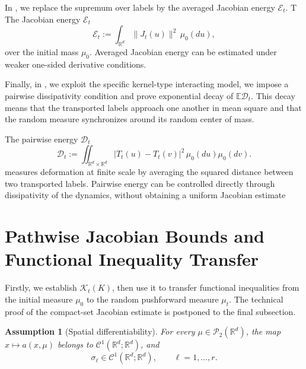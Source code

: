 \documentclass{tsp-short}
\newtheorem{assumption}{Assumption}
\theoremstyle{remark}
\theoremstyle{definition}
\newcommand{\R}{\mathbb{R}} %
\newcommand{\cP}{\mathcal{P}} %
\newcommand{\cC}{\mathcal{C}} %
\newcommand{\E}{\mathbb E} %
\begin{document}
In , we replace the supremum over labels by the averaged Jacobian energy \(\mathcal E_t\). T
The Jacobian energy \(\mathcal E_t\)
\begin{equation*}
	\mathcal E_t := \int_{\R^d}\|J_t(u)\|^2\,\mu_0(du),
\end{equation*}
over the initial mass \( \mu_0 \). Averaged Jacobian energy can be estimated under weaker one-sided
derivative conditions.

Finally, in , we exploit the specific kernel-type interacting model,
we impose a pairwise dissipativity condition and prove exponential decay of \(\E\mathcal D_t\).
This decay means that the transported labels approach one another in mean square and that the random measure synchronizes around its random
center of mass.

The pairwise energy \(\mathcal D_t\)
\begin{equation*}
	\mathcal D_t :=	\iint_{\R^d\times\R^d} |T_t(u)-T_t(v)|^2\,\mu_0(du)\mu_0(dv).
\end{equation*}
measures deformation at finite scale by averaging the squared distance between two transported labels.
Pairwise energy can be controlled directly through dissipativity of the dynamics, without obtaining a uniform Jacobian estimate

\clearpage

\section{Pathwise Jacobian Bounds and Functional Inequality Transfer}\label{sec:jacobian-bound}

Firstly, we establish \(\mathcal K_t(K)\), then use it to transfer functional inequalities from the initial measure \( \mu_0 \) to the
random pushforward measure \( \mu_t \). The technical proof of the compact-set Jacobian estimate is postponed to the final subsection.

\begin{assumption}[Spatial differentiability]\label{ass:flow-differentiability}
	For every \(\mu\in\cP_2(\R^d)\), the map \(x\mapsto a(x,\mu)\) belongs to
	\(\cC^1(\R^d;\R^d)\), and
	\begin{equation*}
		\sigma_\ell\in \cC^1(\R^d;\R^d), \qquad \ell=1,\dots,r.
	\end{equation*}
\end{assumption}
\end{document}
